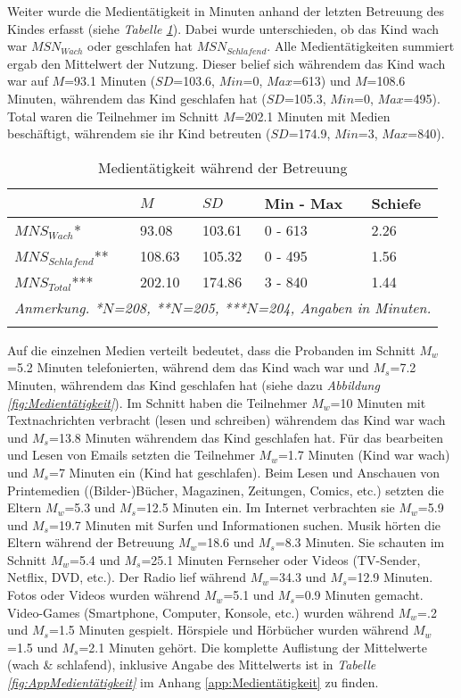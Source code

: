 Weiter wurde die Medientätigkeit in Minuten anhand der letzten Betreuung des Kindes erfasst (siehe \textit{Tabelle \ref{table:Medientätigkeit}}). Dabei wurde unterschieden, ob das Kind wach war $MSN_{Wach}$ oder geschlafen hat $MSN_{Schlafend}$. Alle Medientätigkeiten summiert ergab den Mittelwert der Nutzung. Dieser belief sich währendem das Kind wach war auf $M$=93.1 Minuten ($SD$=103.6, $Min$=0, $Max$=613) und $M$=108.6 Minuten, währendem das Kind geschlafen hat ($SD$=105.3, $Min$=0, $Max$=495). Total waren die Teilnehmer im Schnitt $M$=202.1 Minuten mit Medien beschäftigt, währendem sie ihr Kind betreuten ($SD$=174.9, $Min$=3, $Max$=840).

\begin{table}[b]
\begin{tabular}{m{8em} m{4em}  m{4em}  m{5em} m{4em}} 
  \hline
  & $M$ & $SD$ & Min - Max & Schiefe\\
  \hline
  $MNS_{Wach}$* & 93.08 & 103.61 & 0 - 613 & 2.26\\
  $MNS_{Schlafend}$** & 108.63 & 105.32 & 0 - 495 & 1.56\\
  $MNS_{Total}$*** & 202.10 & 174.86 & 3 - 840 & 1.44 \\
  \hline
  \multicolumn{5}{l}{\textit{Anmerkung. *$N$=208, **$N$=205, ***$N$=204, Angaben in Minuten.}}\\
  &&&&\\
\end{tabular}
\caption{Medientätigkeit während der Betreuung}
\label{table:Medientätigkeit}
\end{table}

Auf die einzelnen Medien verteilt bedeutet, dass die Probanden im Schnitt $M_{w}$=5.2 Minuten telefonierten, während dem das Kind wach war und $M_{s}$=7.2 Minuten, währendem das Kind geschlafen hat (siehe dazu \textit{Abbildung \ref{fig:Medientätigkeit}}). Im Schnitt haben die Teilnehmer $M_{w}$=10 Minuten mit Textnachrichten verbracht (lesen und schreiben) währendem das Kind war wach und $M_{s}$=13.8 Minuten währendem das Kind geschlafen hat. Für das bearbeiten und Lesen von Emails setzten die Teilnehmer $M_{w}$=1.7 Minuten (Kind war wach) und $M_{s}$=7 Minuten ein (Kind hat geschlafen). Beim Lesen und Anschauen von Printemedien ((Bilder-)Bücher, Magazinen, Zeitungen, Comics, etc.) setzten die Eltern $M_{w}$=5.3 und $M_{s}$=12.5 Minuten ein. Im Internet verbrachten sie $M_{w}$=5.9 und $M_{s}$=19.7 Minuten mit Surfen und Informationen suchen. Musik hörten die Eltern während der Betreuung $M_{w}$=18.6 und $M_{s}$=8.3 Minuten. Sie schauten im Schnitt $M_{w}$=5.4 und $M_{s}$=25.1 Minuten Fernseher oder Videos (TV-Sender, Netflix, DVD, etc.). Der Radio lief während $M_{w}$=34.3 und $M_{s}$=12.9 Minuten. Fotos oder Videos wurden während $M_{w}$=5.1 und $M_{s}$=0.9 Minuten gemacht. Video-Games (Smartphone, Computer, Konsole, etc.) wurden während $M_{w}$=.2 und $M_{s}$=1.5 Minuten gespielt. Hörspiele und Hörbücher wurden während $M_{w}$=1.5 und $M_{s}$=2.1 Minuten gehört. Die komplette Auflistung der Mittelwerte (wach \& schlafend), inklusive Angabe des  Mittelwerts ist in \textit{Tabelle \ref{fig:AppMedientätigkeit}} im Anhang \ref{app:Medientätigkeit} zu finden.


